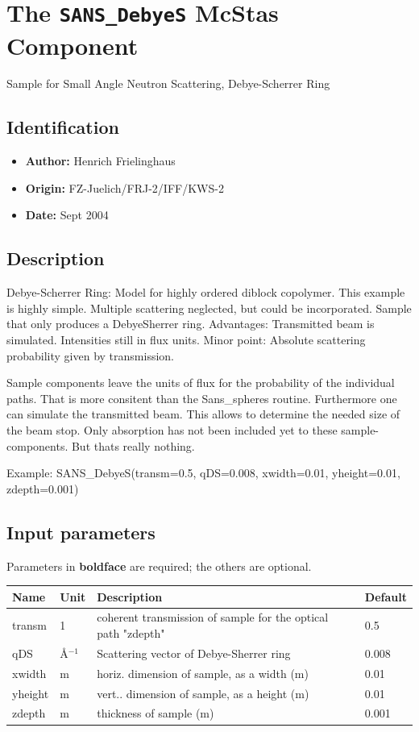 \section{The \texttt{SANS\_DebyeS} McStas Component}
Sample for Small Angle Neutron Scattering, Debye-Scherrer Ring

\subsection*{Identification}
\begin{itemize}
  \item \textbf{Author:} Henrich Frielinghaus
  \item \textbf{Origin:} FZ-Juelich/FRJ-2/IFF/KWS-2
  \item \textbf{Date:} Sept 2004
\end{itemize}

\subsection*{Description}
Debye-Scherrer Ring: Model for highly ordered diblock copolymer. This example is highly simple. Multiple scattering neglected, but could be incorporated. Sample that only produces a DebyeSherrer ring. Advantages: Transmitted beam is simulated. Intensities still in flux units. Minor point: Absolute scattering probability given by transmission.

Sample components leave the units of flux for the probability of the individual paths. That is more consitent than the Sans\_spheres routine. Furthermore one can simulate the transmitted beam. This allows to determine the needed size of the beam stop. Only absorption has not been included yet to these sample-components. But thats really nothing.

Example: SANS\_DebyeS(transm=0.5, qDS=0.008, xwidth=0.01, yheight=0.01, zdepth=0.001)

\subsection*{Input parameters}
Parameters in \textbf{boldface} are required; the others are optional.

\begin{longtable}{p{}p{}p{}p{}}
\toprule
\textbf{Name} & \textbf{Unit} & \textbf{Description} & \textbf{Default} \\
\midrule
\endhead
transm & 1 & coherent transmission of sample for the optical path "zdepth" & 0.5 \\
qDS & \AA{}$^{-1}$ & Scattering vector of Debye-Sherrer ring & 0.008 \\
xwidth & m & horiz. dimension of sample, as a width (m) & 0.01 \\
yheight & m & vert.. dimension of sample, as a height (m) & 0.01 \\
zdepth & m & thickness of sample (m) & 0.001 \\
\bottomrule
\end{longtable}

